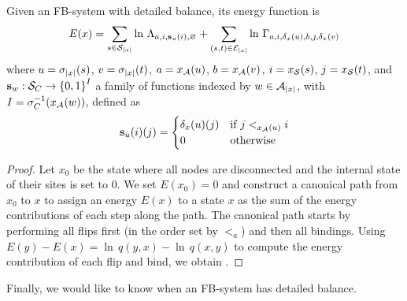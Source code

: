 \begin{proposition}
  \label{prop:fb-energy}
  Given an FB-system with detailed balance,
  its energy function is
  \begin{equation}
    \label{eq:fb-energy}
    E(x) = \sum_{s \in \mathcal{S}_{\left|x\right|}}
    \ln\,\Lambda_{a,i,\boldsymbol{\mathbf{s}}_u(i),\varnothing} +
    \sum_{(s,t) \in \mathcal{E}_{\left|x\right|}}
    \ln\,\Gamma_{a,i,\delta_x(u),b,j,\delta_x(v)}
  \end{equation}
  where $u = \sigma_{\left|x\right|}(s)$, $v = \sigma_{\left|x\right|}(t)$,
  $a = x_{\mathcal{A}}(u)$, $b = x_{\mathcal{A}}(v)$,
  $i = x_{\mathcal{S}}(s)$, $j = x_{\mathcal{S}}(t)$,
  and $\boldsymbol{\mathbf{s}}_w: \mathcal{S}_C \to \left\{ 0,1 \right\}^I$
  a family of functions indexed by $w \in \mathcal{A}_{\left|x\right|}$,
  with $I = \sigma_C^{-1}(x_{\mathcal{A}}(w))$,
  defined as
  \begin{equation*}
    \boldsymbol{\mathbf{s}}_u(i)(j) = \begin{cases}
      \delta_x(u)(j) & \text{if $j <_{x_{\mathcal{A}}(u)} i$} \\
      0 & \text{otherwise}
    \end{cases}
  \end{equation*}
\end{proposition}
\begin{proof}
  Let $x_0$ be the state where all nodes are disconnected
  and the internal state of their sites is set to $0$.
  We set $E(x_0) = 0$
  and construct a canonical path from $x_0$ to $x$
  to assign an energy $E(x)$ to a state $x$
  as the sum of the energy contributions of each step along the path.
  The canonical path starts by performing all flips first
  (in the order set by $<_a$) and then all bindings.
  Using $E(y) - E(x) = \ln\,q(y,x) - \ln\,q(x,y)$ to compute
  the energy contribution of each flip and bind,
  we obtain .
\end{proof}

Finally, we would like to know when an FB-system
has detailed balance.

